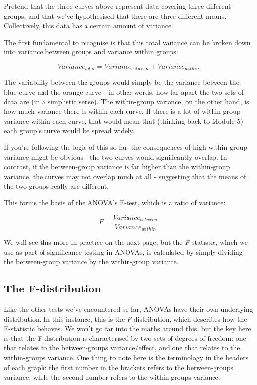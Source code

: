 \documentclass[
]{book}
\begin{document}
Pretend that the three curves above represent data covering three
different groups, and that we've hypothesised that there are three
different means. Collectively, this data has a certain amount of
variance.

The first fundamental to recognise is that this total variance can be
broken down into variance between groups and variance within groups:

\[
Variance_{total} = Variance_{between} + Variance_{within}
\]

The variability between the groups would simply be the variance between
the blue curve and the orange curve - in other words, how far apart the
two sets of data are (in a simplistic sense). The within-group variance,
on the other hand, is how much variance there is within each curve. If
there is a lot of within-group variance within each curve, that would
mean that (thinking back to Module 5) each group's curve would be spread
widely.

If you're following the logic of this so far, the consequences of high
within-group variance might be obvious - the two curves would
significantly overlap. In contrast, if the between-group variance is far
higher than the within-group variance, the curves may not overlap much
at all - suggesting that the means of the two groups really are
different.

This forms the basis of the ANOVA's F-test, which is a ratio of
variance:

\[
F = \frac{Variance_{between}}{Variance_{within}}
\]

We will see this more in practice on the next page, but the
\emph{F}-statistic, which we use as part of significance testing in ANOVAs, is
calculated by simply dividing the between-group variance by the
within-group variance.

\hypertarget{the-f-distribution}{%
\subsection{The F-distribution}\label{the-f-distribution}}

Like the other tests we've encountered so far, ANOVAs have their own
underlying distribution. In this instance, this is the \emph{F} distribution,
which describes how the F-statistic behaves. We won't go far into the
maths around this, but the key here is that the F distribution is
characterised by two sets of degrees of freedom: one that relates to the
between-groups variance/effect, and one that relates to the
within-groups variance. One thing to note here is the terminology in the
headers of each graph: the first number in the brackets refers to the
between-groups variance, while the second number refers to the
within-groups variance.
\end{document}
